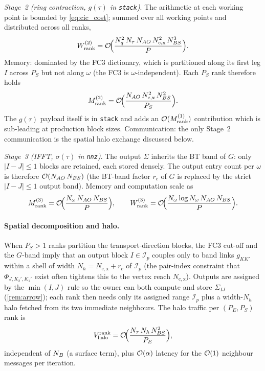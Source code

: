 \emph{Stage~2 (ring contraction, $g(\tau)$ in \texttt{stack})}. The
arithmetic at each working point is bounded by
\cref{eq:cic_cost}; summed over all working points and
distributed across all ranks,
\begin{equation}
  W^{(2)}_\mathrm{rank}
  = \mathcal{O}\!\Bigl(\frac{N_q^{2}\,N_\tau\,N_{AO}\,N_\mathrm{c,x}^{2}\,N_{BS}^{3}}{P}\Bigr).
\end{equation}
Memory: dominated by the FC3 dictionary, which is partitioned along
its first leg $I$ across $P_S$ but not along $\omega$ (the FC3 is
$\omega$-independent). Each $P_S$ rank therefore holds
\begin{equation}
  M^{(2)}_\mathrm{rank}
  = \mathcal{O}\!\Bigl(\frac{N_{AO}\,N_\mathrm{c,x}^{2}\,N_{BS}^{2}}{P_S}\Bigr).
\end{equation}
The $g(\tau)$ payload itself is in \texttt{stack} and adds an
$\mathcal{O}(M^{(1)}_\mathrm{rank})$ contribution which is sub-leading at
production block sizes. Communication: the only Stage~2
communication is the spatial halo exchange discussed below.

\emph{Stage~3 (IFFT, $\sigma(\tau)$ in \texttt{nnz})}. The output
$\Sigma$ inherits the BT band of $G$: only $|I-J|\le 1$ blocks are
retained, each stored densely. The output entry count per $\omega$
is therefore $\mathcal{O}(N_{AO}\,N_{BS})$ (the BT-band factor $r_c$ of $G$
is replaced by the strict $|I-J|\le 1$ output band). Memory and
computation scale as
\begin{equation}
  M^{(3)}_\mathrm{rank}
    = \mathcal{O}\!\Bigl(\frac{N_\omega\,N_{AO}\,N_{BS}}{P}\Bigr),
  \qquad
  W^{(3)}_\mathrm{rank}
    = \mathcal{O}\!\Bigl(\frac{N_\omega\log N_\omega\,N_{AO}\,N_{BS}}{P}\Bigr).
\end{equation}

\paragraph{Spatial decomposition and halo.} When $P_S>1$ ranks
partition the transport-direction blocks, the FC3 cut-off and the
$G$-band imply that an output block $I\in\mathcal{I}_p$ couples only
to band links $g_{KK'}$ within a shell of width
$N_h=N_\mathrm{c,x}+r_c$ of $\mathcal{I}_p$ (the pair-index
constraint that $\Phi_{J,K_2',K_1'}$ exist often tightens this to the
vertex reach $N_\mathrm{c,x}$). Outputs are assigned by the
$\min(I,J)$ rule so the owner can both compute and store $\Sigma_{IJ}$
(\cref{rem:arrow}); each rank then needs only its assigned range
$\mathcal{I}_p$ plus a width-$N_h$ halo fetched from its two
immediate neighbours. The halo traffic per $(P_E,P_S)$ rank is
\begin{equation}\label{eq:halo_volume}
  V_\mathrm{halo}^\mathrm{rank}
  = \mathcal{O}\!\Bigl(\frac{N_\tau\,N_h\,N_{BS}^{2}}{P_E}\Bigr),
\end{equation}
independent of $N_{B}$ (a surface term), plus $\mathcal{O}(\alpha)$ latency for
the $\mathcal{O}(1)$ neighbour messages per iteration.


